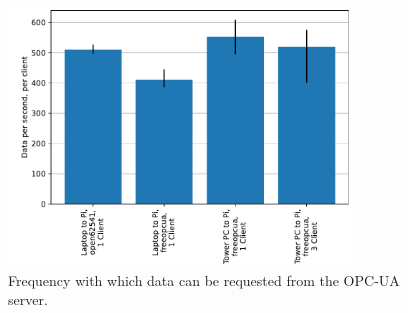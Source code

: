 \documentclass[conference]{IEEEtran}
\begin{document}
\begin{figure}[t]
    \centerline{\includegraphics[width=9.1cm]{Pictures/OPCUASpeed1D.pdf}}
    \caption{Frequency with which data can be requested from the OPC-UA server.}
    \label{fig:OPCUASpeed1D}
\end{figure}
\end{document}
